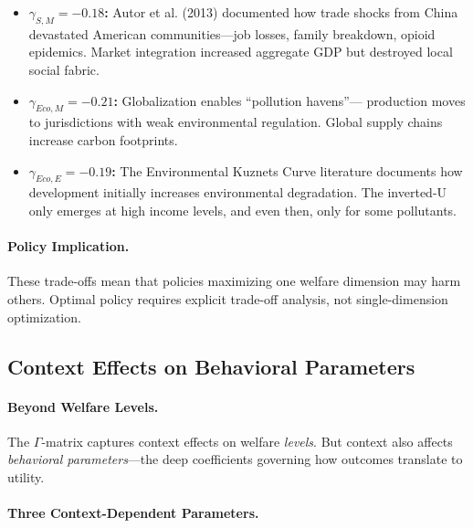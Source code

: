 \begin{itemize}
\item \textbf{$\gamma_{S,M} = -0.18$:} Autor et al. (2013) documented how trade 
shocks from China devastated American communities---job losses, family breakdown, 
opioid epidemics. Market integration increased aggregate GDP but destroyed 
local social fabric.

\item \textbf{$\gamma_{Eco,M} = -0.21$:} Globalization enables ``pollution havens''---
production moves to jurisdictions with weak environmental regulation. 
Global supply chains increase carbon footprints.

\item \textbf{$\gamma_{Eco,E} = -0.19$:} The Environmental Kuznets Curve literature 
documents how development initially increases environmental degradation. 
The inverted-U only emerges at high income levels, and even then, only for 
some pollutants.
\end{itemize}

\paragraph{Policy Implication.}
These trade-offs mean that policies maximizing one welfare dimension may 
harm others. Optimal policy requires explicit trade-off analysis, not 
single-dimension optimization.

\subsection{Context Effects on Behavioral Parameters}

\paragraph{Beyond Welfare Levels.}
The $\Gamma$-matrix captures context effects on welfare \emph{levels}.
But context also affects \emph{behavioral parameters}---the deep coefficients 
governing how outcomes translate to utility.

\paragraph{Three Context-Dependent Parameters.}

